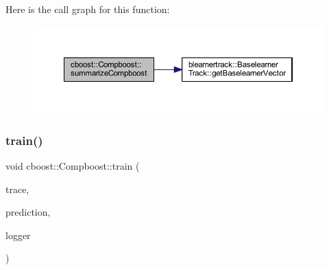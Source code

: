 Here is the call graph for this function\+:
\nopagebreak
\begin{figure}[H]
\begin{center}
\leavevmode
\includegraphics[width=350pt]{classcboost_1_1_compboost_a7be8cb767054ece895d535c1f468233e_cgraph}
\end{center}
\end{figure}
\mbox{\label{classcboost_1_1_compboost_aa898572eb2c83e0b95c12788a859333b}} 
\subsubsection{\texorpdfstring{train()}{train()}}
{\footnotesize\ttfamily void cboost\+::\+Compboost\+::train (\begin{DoxyParamCaption}\item[{const bool \&}]{trace,  }\item[{const arma\+::vec \&}]{prediction,  }\item[{\mbox{\hyperlink{classloggerlist_1_1_logger_list}{loggerlist\+::\+Logger\+List}} $\ast$}]{logger }\end{DoxyParamCaption})}

